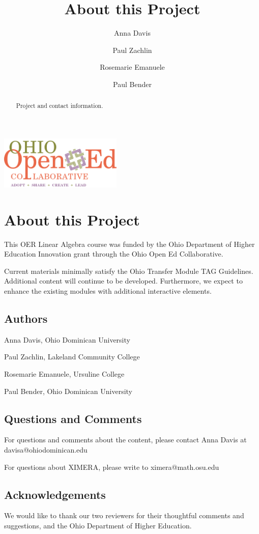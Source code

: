 \documentclass{ximera}
\author{Anna Davis \and Paul Zachlin \and Rosemarie Emanuele \and Paul Bender} \title{About this Project} \license{CC-BY 4.0}
\begin{document}
\begin{abstract}
 Project and contact information.
\end{abstract}
\maketitle

\begin{image}
\includegraphics[height=1in]{ooec.jpg}
\end{image}

\section{About this Project}
This OER Linear Algebra course was funded by the Ohio Department of Higher Education Innovation grant through the Ohio Open Ed Collaborative. 

Current materials minimally satisfy the Ohio Transfer Module TAG Guidelines.  Additional content will continue to be developed.  Furthermore, we expect to enhance the existing modules with additional interactive elements.

\subsection{Authors}
Anna Davis, Ohio Dominican University

Paul Zachlin, Lakeland Community College

Rosemarie Emanuele, Ursuline College

Paul Bender, Ohio Dominican University

\subsection{Questions and Comments}
For questions and comments about the content, please contact Anna Davis at davisa@ohiodominican.edu

For questions about XIMERA, please write to ximera@math.osu.edu

\subsection{Acknowledgements}
We would like to thank our two reviewers for their thoughtful comments and suggestions, and the Ohio Department of Higher Education.
\end{document}

